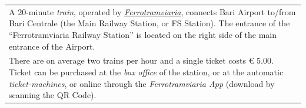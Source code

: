 \documentclass[
	openany, %
	parskip=full, %
	12pt, %
	a4paper, %
]{conferencebooklet} %
\begin{document}
\begin{adjustwidth}{10pt}{20pt}
\begin{table}[h!]
{\begin{tabular}{p{110mm}}
            \vspace{1mm}
            A 20-minute \textit{train}, operated by \color{blue}\href{https://www.ferrovienordbarese.it/home}{\textit{Ferrotramviaria}}\color{black}, connects Bari Airport to/from Bari Centrale (the Main Railway Station, or FS Station). The entrance of the “Ferrotramviaria Railway Station” is located on the right side of the main entrance of the Airport. \\
            There are on average two trains per hour and a single ticket costs € 5.00. Ticket can be purchased at the \textit{box office} of the station, or at the automatic \textit{ticket-machines}, or online through the \textit{Ferrotramviaria App} (download by scanning the QR Code).
            \end{tabular}
            }
\end{table}


\end{adjustwidth}
\end{document}
